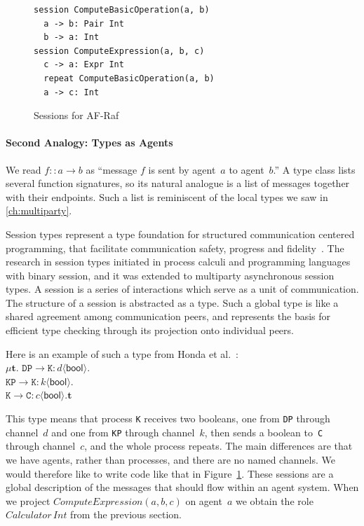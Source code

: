 \documentclass[a4paper,12pt,oneside,fleqn]{book} %
\begin{document}
\begin{figure}\footnotesize %
\begin{verbatim}
session ComputeBasicOperation(a, b)
  a -> b: Pair Int
  b -> a: Int
session ComputeExpression(a, b, c)
  c -> a: Expr Int
  repeat ComputeBasicOperation(a, b)
  a -> c: Int
\end{verbatim}
\caption{Sessions for AF-Raf}\label{fig:sessions}
\end{figure} %

{\def\l#1->#2:#3<#4>{\mathtt{#1}\to\mathtt{#2}:#3\langle\mathsf{#4}\rangle}
\paragraph{Second Analogy: Types as Agents} We read $f::a\to b$ as
``message $f$ is sent by agent~$a$ to agent~$b$.'' A type class lists
several function signatures, so its natural analogue is a list of messages
together with their endpoints. Such a list is reminiscent of the
local types we saw in \autoref{ch:multiparty}.


Session types represent a type foundation for structured communication
centered programming, that facilitate communication safety, progress and
fidelity~\cite{dblp:conf/popl/hondayc08}. The research in session types
initiated in process calculi and programming languages with binary session,
and it was extended to multiparty asynchronous session types. A session is
a series of interactions which serve as a unit of communication. The
structure of a session is abstracted as a type. Such a global type is like
a shared agreement among communication peers, and represents the basis for
efficient type checking through its projection onto individual peers.



Here is an example of such a type from
Honda et al.~\cite{dblp:conf/popl/hondayc08}:\\
$\mu\mathbf{t}.$
  $\l DP->K:d<bool>. $\\
  $\l KP->K:k<bool>. $\\
  $\l K->C:c<bool>.\mathbf{t}$

This type means that process \texttt{K} receives two booleans, one from
\texttt{DP} through channel~$d$ and one from \texttt{KP} through channel~$k$,
then sends a boolean to~\texttt{C} through channel~$c$, and the whole process
repeats. The main differences are that we have agents, rather than processes,
and there are no named channels. We would therefore like to write code like
that in Figure~\ref{fig:sessions}.  These sessions are a global description of
the messages that should flow within an agent system. When we project
$\mathit{ComputeExpression}(a,b,c)$ on agent~$a$ we obtain the role
$\mathit{Calculator}\,\mathit{Int}$ from the previous section.}
\end{document}
